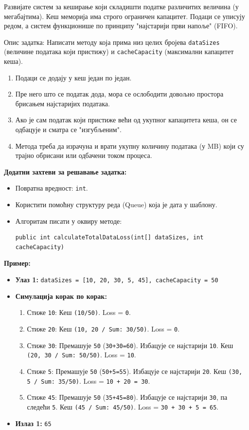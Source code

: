 Развијате систем за кеширање који складишти податке различитих величина (у мегабајтима). Кеш меморија има строго ограничен капацитет. Подаци се уписују редом, а систем функционише по принципу "најстарији први напоље" (FIFO).

Опис задатка: Написати методу која прима низ целих бројева \texttt{dataSizes} (величине података који пристижу) и \texttt{cacheCapacity} (максимални капацитет кеша).

\begin{enumerate}
	\item Подаци се додају у кеш један по један.
	\item Пре него што се податак дода, мора се ослободити довољно простора брисањем најстаријих података.
	\item Ако је сам податак који пристиже већи од укупног капацитета кеша, он се одбацује и сматра се "изгубљеним".
	\item Метода треба да израчуна и врати укупну количину података (у MB) који су трајно обрисани или одбачени током процеса.
\end{enumerate}

\textbf{Додатни захтеви за решавање задатка:}
\begin{itemize}
	\item Повратна вредност: \texttt{int}.
	\item Користити помоћну структуру реда (Queue) која је дата у шаблону.
	\item Алгоритам писати у оквиру методе:
	\begin{Verbatim}[fontsize=\small]
public int calculateTotalDataLoss(int[] dataSizes, int cacheCapacity)
	\end{Verbatim}
\end{itemize}

\textbf{Пример:}
\begin{itemize}
	\item \textbf{Улаз 1:} \texttt{dataSizes = [10, 20, 30, 5, 45], cacheCapacity = 50}
	\item \textbf{Симулација корак по корак:}
	\begin{enumerate}
		\item Стиже \texttt{10}: Кеш \texttt{(10/50)}. Loss = \texttt{0}.
		\item Стиже \texttt{20}: Кеш \texttt{(10, 20 / Sum: 30/50)}. Loss = \texttt{0}.
		\item Стиже \texttt{30}: Премашује \texttt{50} (\texttt{30+30=60}). Избацује се најстарији \texttt{10}. Кеш \texttt{(20, 30 / Sum: 50/50)}. Loss = \texttt{10}.
		\item Стиже \texttt{5}: Премашује \texttt{50} (\texttt{50+5=55}). Избацује се најстарији \texttt{20}. Кеш \texttt{(30, 5 / Sum: 35/50)}. Loss = \texttt{10 + 20 = 30}.
		\item Стиже \texttt{45}: Премашује \texttt{50} (\texttt{35+45=80}). Избацује се најстарији \texttt{30}, па следећи \texttt{5}. Кеш \texttt{(45 / Sum: 45/50)}. Loss = \texttt{30 + 30 + 5 = 65}.
	\end{enumerate}
	\item \textbf{Излаз 1:} \texttt{65}
\end{itemize}

